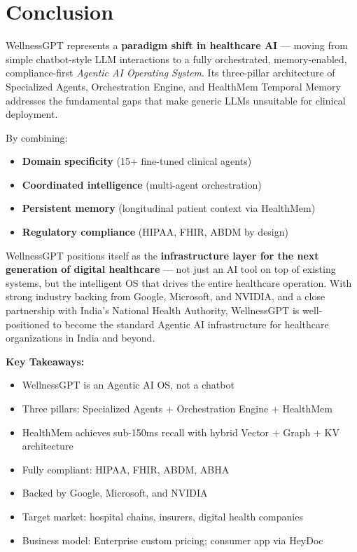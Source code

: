 \documentclass[12pt,a4paper]{article}
\begin{document}
\newpage

\section{Conclusion}

WellnessGPT represents a \textbf{paradigm shift in healthcare AI} — moving from simple chatbot-style LLM interactions to a fully orchestrated, memory-enabled, compliance-first \emph{Agentic AI Operating System}. Its three-pillar architecture of Specialized Agents, Orchestration Engine, and HealthMem Temporal Memory addresses the fundamental gaps that make generic LLMs unsuitable for clinical deployment.

By combining:
\begin{itemize}[noitemsep]
    \item \textbf{Domain specificity} (15+ fine-tuned clinical agents)
    \item \textbf{Coordinated intelligence} (multi-agent orchestration)
    \item \textbf{Persistent memory} (longitudinal patient context via HealthMem)
    \item \textbf{Regulatory compliance} (HIPAA, FHIR, ABDM by design)
\end{itemize}

WellnessGPT positions itself as the \textbf{infrastructure layer for the next generation of digital healthcare} — not just an AI tool on top of existing systems, but the intelligent OS that drives the entire healthcare operation. With strong industry backing from Google, Microsoft, and NVIDIA, and a close partnership with India's National Health Authority, WellnessGPT is well-positioned to become the standard Agentic AI infrastructure for healthcare organizations in India and beyond.

\vspace{1cm}

\begin{mdframed}[backgroundcolor=lightgray, linecolor=primaryblue, linewidth=1pt, roundcorner=5pt]
\textbf{Key Takeaways:}
\begin{itemize}[noitemsep]
    \item WellnessGPT is an Agentic AI OS, not a chatbot
    \item Three pillars: Specialized Agents + Orchestration Engine + HealthMem
    \item HealthMem achieves sub-150ms recall with hybrid Vector + Graph + KV architecture
    \item Fully compliant: HIPAA, FHIR, ABDM, ABHA
    \item Backed by Google, Microsoft, and NVIDIA
    \item Target market: hospital chains, insurers, digital health companies
    \item Business model: Enterprise custom pricing; consumer app via HeyDoc
\end{itemize}
\end{mdframed}
\end{document}
